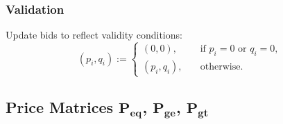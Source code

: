 \subsubsection{Validation}
Update bids to reflect validity conditions:
\begin{equation*}
    (p_i, q_i) := 
    \begin{cases}
        (0, 0), \quad &\text{if } p_i = 0 \text{ or } q_i = 0, \\
        (p_i, q_i), \quad &\text{otherwise.}
    \end{cases}
\end{equation*}


\subsection{Price Matrices $\mathbf{P_{eq}}$, $\mathbf{P_{ge}}$, $\mathbf{P_{gt}}$}

